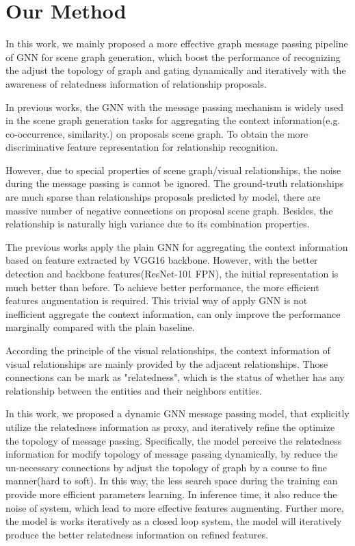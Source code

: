 \section{Our Method}
In this work, we mainly proposed a more effective graph message passing pipeline of GNN for scene graph generation, which boost the performance of recognizing the adjust the topology of graph and gating dynamically and iteratively with the awareness of relatedness information of relationship proposals. 

In previous works, the GNN with the message passing mechanism is widely used in the scene graph generation tasks for aggregating the context information(e.g. co-occurrence, similarity.) on proposals scene graph. To obtain the more discriminative feature representation for relationship recognition.

However, due to special properties of scene graph/visual relationships, the noise during the message passing is cannot be ignored.  
The ground-truth relationships are much sparse than relationships proposals predicted by model, there are massive number of negative connections on proposal scene graph. Besides, the relationship is naturally high variance due to its combination properties. 

The previous works apply the plain GNN for aggregating the context information based on feature extracted by VGG16 backbone. 
However, with the better detection and backbone features(ResNet-101 FPN), the initial representation is much better than before.
To achieve better performance, the more efficient features augmentation is required.
This trivial way of apply GNN is not inefficient aggregate the context information, can only improve the performance marginally compared with the plain baseline. 

According the principle of the visual relationships, the context information of visual relationships are mainly provided by the adjacent relationships. 
Those connections can be mark as "relatedness", which is the status of whether has any relationship between the entities and their neighbors entities.

In this work, we proposed a dynamic GNN message passing model, that explicitly utilize the relatedness information as proxy, and iteratively refine the optimize the topology of message passing. 
Specifically, the model perceive the relatedness information for modify topology of message passing dynamically, by reduce the un-necessary connections by adjust the topology of graph by a course to fine manner(hard to soft). 
In this way, the less search space during the training can provide more efficient parameters learning. In inference time, it also reduce the noise of system, which lead to more effective features augmenting. 
Further more, the model is works iteratively as a closed loop system, the model will iteratively produce the better relatedness information on refined features. 

